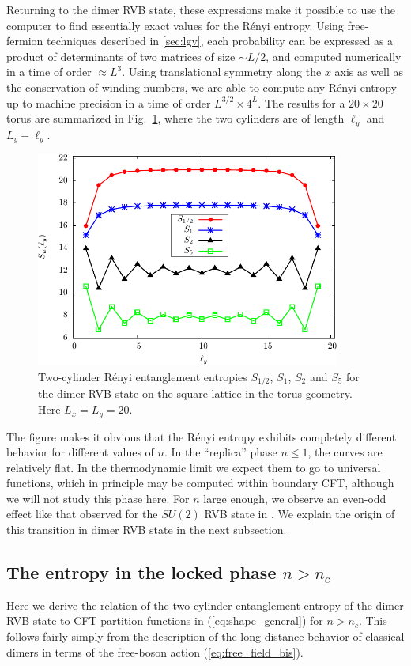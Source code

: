 \documentclass[11pt]{iopart}
\begin{document}
Returning to the dimer RVB state, these expressions make it possible to use the computer to find essentially exact values for the R\'enyi entropy. Using free-fermion techniques described in \ref{sec:lgv}, each probability can be expressed as a product of determinants of two matrices of size $\sim L/2$, and computed numerically in a time of order $\approx L^3$. Using translational symmetry along the $x$ axis as well as the conservation of winding numbers, we are able to compute any R\'enyi entropy up to machine precision in a time of order $L^{3/2}\times 4^L$.
The results for a $20\times 20$ torus are summarized in Fig.~\ref{fig:ee_d_torus}, where the two cylinders are of length $\ell_y$ and $L_y-\ell_y$. 
\begin{figure}[ht]
 \begin{center}
 \includegraphics[width=10cm]{./figures/ee_d_torus.pdf}
 \end{center}
\caption{Two-cylinder R\'enyi entanglement entropies $S_{1/2}$, $S_1$, $S_2$ and $S_5$ for the dimer RVB state on the square lattice in the torus geometry. Here $L_x=L_y=20$.}
\label{fig:ee_d_torus}
\end{figure}
The figure makes it obvious that the R\'enyi entropy exhibits completely different behavior for different values of $n$. In the ``replica'' phase $n \leq 1$, the curves are relatively flat. In the thermodynamic limit we expect them to go to universal functions, which in principle may be computed within boundary CFT, although we will not study this phase here. For $n$ large enough, we observe an even-odd effect like that observed for the $SU(2)$ RVB state in \cite{Ju2012}. We explain the origin of this transition in dimer RVB state in the next subsection.



\subsection{The entropy in the locked phase $n>n_c$}
\label{sec:bpt}
Here we derive the relation of the two-cylinder entanglement entropy of the dimer RVB state to CFT partition functions in 
(\ref{eq:shape_general}) for $n>n_c$. This follows fairly simply from the description of the long-distance behavior of classical dimers in terms of the free-boson action (\ref{eq:free_field_bis}).
\end{document}
